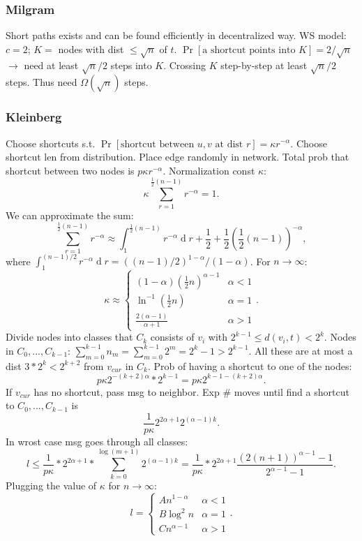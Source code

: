 \documentclass[a4paper,twocolumn,10pt]{article}
\newcommand{\pte}[1]{\left({#1}\right)}
\newcommand{\op}{\operatorname}
\newcommand{\dd}{\op{d}}
\begin{document}
	\subsubsection{Milgram}
		Short paths exists and can be found efficiently in decentralized way.
		WS model: $c=2$; $K=$ nodes with dist $\le\sqrt{n}$ of $t$.
		$\Pr[\textrm{a shortcut points into $K$}]=2/\sqrt{n}$
			$\to$ need at least $\sqrt{n}/2$ steps into $K$.
		Crossing $K$ step-by-step at least $\sqrt{n}/2$ steps.
		Thus need $\Omega(\sqrt n)$ steps.
	
	\subsubsection{Kleinberg}
		Choose shortcuts s.t.
			$\Pr[\textrm{shortcut between $u,v$ at dist $r$}]=\kappa r^{-\alpha}$.
		Choose shortcut len from distribution.
		Place edge randomly in network.
		Total prob that shortcut between two nodes is $p\kappa r^{-\alpha}$.
		Normalization const $\kappa$:
		\[
			\kappa\sum_{r = 1}^{\frac{1}{2}(n - 1)}r^{-\alpha} = 1.
		\]
		We can approximate the sum:
		\[
			\sum\limits_{r= 1}^{\frac{1}{2}(n - 1)} r^{-\alpha}
			\approx\int_{1}^{\frac{1}{2}(n - 1)} r^{-\alpha}\dd r
			+\frac{1}{2}+\frac{1}{2}\pte{\frac{1}{2}(n - 1)}^{-\alpha},
		\]
		where $\int_{1}^{(n - 1)/2} r^{-\alpha}\dd r=((n-1)/2)^{1-\alpha}/(1-\alpha)$.
		For $n\to\infty$:
		\[
			\kappa\approx\left\{\begin{array}{ll}
				(1-\alpha)(\frac{1}{2}n)^{\alpha - 1} &\alpha<1\\
				\ln^{-1}(\frac{1}{2}n) &\alpha = 1\\
				\frac{2(\alpha-1)}{\alpha+1} &\alpha>1
			\end{array}\right..
		\]
		Divide nodes into classes that $C_k$ consists of $v_i$ with
			$2^{k-1}\le d(v_i,t)<2^k$.
		Nodes in $C_0,...,C_{k-1}$:
			$\sum_{m=0}^{k-1}n_m = \sum_{m=0}^{k-1}2^m = 2^k-1 > 2^{k-1}$.
		All these are at most a dist $3 * 2^k < 2^{k+2}$ from $v_{cur}$ in $C_k$.
		Prob of having a shortcut to one of the nodes:
		\[
			p\kappa 2^{-(k+2)\alpha}*2^{k-1}=p\kappa 2^{k-1-(k+2)\alpha}.
		\]
		If $v_{cur}$ has no shortcut, pass msg to neighbor.
		Exp $\#$ moves until find a shortcut to $C_0,...,C_{k-1}$ is 
		\[
			\frac{1}{p\kappa} 2^{2\alpha+1} 2^{(\alpha-1)k}.
		\]
		In wrost case msg goes through all classes:
		\[
			l \le \frac{1}{p\kappa}*2^{2\alpha+1}*
				\sum_{k=0}^{\log(m+1)}2^{(\alpha-1)k}
			= \frac{1}{p\kappa}*2^{2\alpha+1}
				\frac{(2(n+1))^{\alpha-1}-1}{2^{\alpha-1}-1}.
		\]
		Plugging the value of $\kappa$ for $n\to\infty$:
		\[
			l=\left\{\begin{array}{ll}
				A n^{1-\alpha} &\alpha<1\\
				B \log^2 n &\alpha = 1\\
				C n^{\alpha-1} &\alpha>1
			\end{array}\right..
		\]
\end{document}
